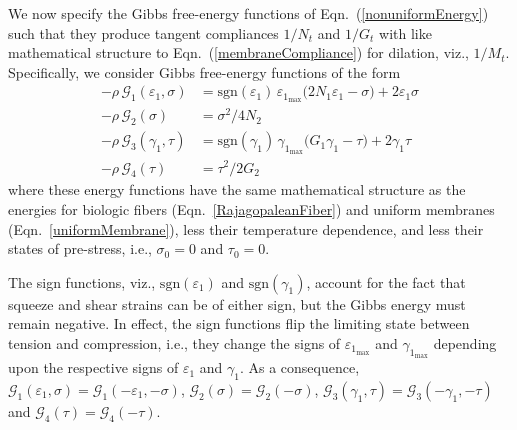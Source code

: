 We now specify the Gibbs free-energy functions of Eqn.~(\ref{nonuniformEnergy}) such that they produce tangent compliances $1/N_t$ and $1/G_t$ with like mathematical structure to Eqn.~(\ref{membraneCompliance}) for dilation, viz., $1/M_t$. Specifically, we consider Gibbs free-energy functions of the form
\begin{subequations}
    \label{nonuniformComplianceEnergies}
    \begin{align}
    -\rho \, \mathcal{G}_1 ( \varepsilon_1 , \sigma ) & = \mathrm{sgn} ( \varepsilon_1 ) \, \varepsilon_{1_{\max}} \bigl( 2 N_1 \varepsilon_1 - \sigma \bigr) + 2 \varepsilon_1 \sigma
    \label{squeezeImplicitEnergy} \\
    -\rho \, \mathcal{G}_2 ( \sigma ) & = \sigma^2 / 4 N_2
    \label{squeezeExplicitEnergy} \\
    -\rho \, \mathcal{G}_3 ( \gamma_1 , \tau ) & = \mathrm{sgn} ( \gamma_1 ) \, \gamma_{1_{\max}} \bigl( G_1 \gamma_1 - \tau \bigr) + 2 \gamma_1 \tau 
    \label{shearImplicitEnergy} \\
    -\rho \, \mathcal{G}_4 ( \tau ) & = \tau^2 / 2 G_2 
    \label{shearExplicitEnergy}
    \end{align}
\end{subequations}
where these energy functions have the same mathematical structure as the energies for biologic fibers (Eqn.~\ref{RajagopaleanFiber}) and uniform membranes (Eqn.~\ref{uniformMembrane}), less their temperature dependence, and less their states of pre-stress, i.e., $\sigma_0 = 0$ and $\tau_0 = 0$.  

The sign functions, viz., $\mathrm{sgn}( \varepsilon_1 )$ and $\mathrm{sgn} ( \gamma_1 )$, account for the fact that squeeze and shear strains can be of either sign, but the Gibbs energy must remain negative.  In effect, the sign functions flip the limiting state between tension and compression, i.e., they change the signs of $\varepsilon_{1_{\max}}$ and $\gamma_{1_{\max}}$ depending upon the respective signs of $\varepsilon_1$ and $\gamma_1$. As a consequence, $\mathcal{G}_1 (\varepsilon_1 , \sigma) = \mathcal{G}_1 (-\varepsilon_1 , -\sigma)$, $\mathcal{G}_2 (\sigma) = \mathcal{G}_2 (-\sigma)$, $\mathcal{G}_3 (\gamma_1 , \tau) = \mathcal{G}_3 (-\gamma_1 , -\tau)$ and $\mathcal{G}_4 (\tau) = \mathcal{G}_4 (-\tau)$.  


